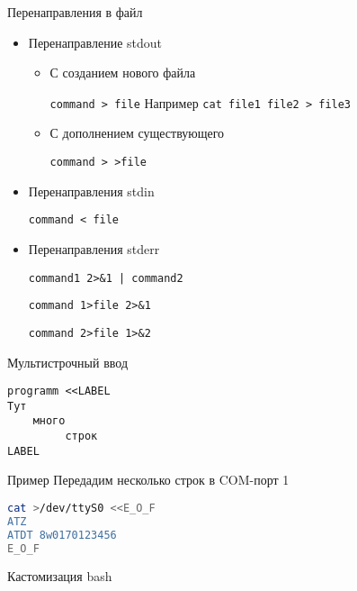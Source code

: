 \documentclass[ignorenonframetext, professionalfonts, hyperref={pdftex, unicode}]{beamer}
\begin{document}
\begin{frame}{Перенаправления в файл}
\begin{itemize}
\item Перенаправление stdout 
\begin{itemize}
\item С созданием нового файла

{\tt command > file} Например {\tt cat file1 file2 > file3}
\item С дополнением существующего

{\tt command > >file}
\end{itemize}
\pause
\item Перенаправления stdin

{\tt command < file}
\pause
\item Перенаправления stderr

{\tt command1 2>\&1 | command2}

{\tt command 1>file 2>\&1}

{\tt command 2>file 1>\&2}
\end{itemize}
\end{frame}

\begin{frame}[fragile]{Мультистрочный ввод}

\begin{verbatim}
programm <<LABEL
Тут
    много
	     строк
LABEL
\end{verbatim}
	
	\begin{block}{Пример}
	Передадим несколько строк в COM-порт 1
\begin{lstlisting}[language=bash]
cat >/dev/ttyS0 <<E_O_F
ATZ
ATDT 8w0170123456
E_O_F
\end{lstlisting}
	\end{block}
\end{frame}

\begin{frame}{Кастомизация bash}
\end{frame}
\end{document}
